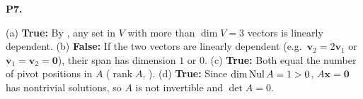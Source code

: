 \documentclass[10pt]{scrartcl}
\newcommand{\vv}[1]{\mathbf{#1}}
\begin{document}
\begin{prob}\textbf{P7.}
\begin{steps}
  \ii (a) \textbf{True:} By , any set in $V$ with more than $\dim V=3$ vectors is linearly dependent.
  \ii (b) \textbf{False:} If the two vectors are linearly dependent (e.g.\ $\vv v_2=2\vv v_1$ or $\vv v_1=\vv v_2=\vv 0$), their span has dimension $1$ or $0$.
  \ii (c) \textbf{True:} Both equal the number of pivot positions in $A$ ($\operatorname{rank}A$, ).
  \ii (d) \textbf{True:} Since $\dim\operatorname{Nul} A=1>0$, $A\vv x=\vv 0$ has nontrivial solutions, so $A$ is not invertible and $\det A=0$.
\end{steps}
\end{prob}
\end{document}
